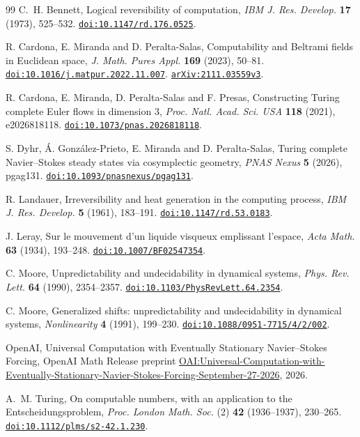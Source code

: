 \documentclass[11pt]{article}
\begin{document}


\begin{thebibliography}{99}
 C.~H. Bennett, Logical reversibility of computation,
\emph{IBM J. Res. Develop.} \textbf{17} (1973), 525--532.
\href{https://doi.org/10.1147/rd.176.0525}{\nolinkurl{doi:10.1147/rd.176.0525}}.

 R. Cardona, E. Miranda and D. Peralta-Salas,
Computability and Beltrami fields in Euclidean space,
\emph{J. Math. Pures Appl.} \textbf{169} (2023), 50--81.
\href{https://doi.org/10.1016/j.matpur.2022.11.007}{\nolinkurl{doi:10.1016/j.matpur.2022.11.007}}.
\href{https://arxiv.org/abs/2111.03559v3}{\nolinkurl{arXiv:2111.03559v3}}.

 R. Cardona, E. Miranda, D. Peralta-Salas and F. Presas,
Constructing Turing complete Euler flows in dimension 3,
\emph{Proc. Natl. Acad. Sci. USA} \textbf{118} (2021), e2026818118.
\href{https://doi.org/10.1073/pnas.2026818118}{\nolinkurl{doi:10.1073/pnas.2026818118}}.

 S. Dyhr, \'{A}. Gonz\'alez-Prieto, E. Miranda and
D. Peralta-Salas, Turing complete Navier--Stokes steady states via
cosymplectic geometry, \emph{PNAS Nexus} \textbf{5} (2026), pgag131.
\href{https://doi.org/10.1093/pnasnexus/pgag131}{\nolinkurl{doi:10.1093/pnasnexus/pgag131}}.

 R. Landauer, Irreversibility and heat generation in
the computing process, \emph{IBM J. Res. Develop.} \textbf{5} (1961),
183--191.
\href{https://doi.org/10.1147/rd.53.0183}{\nolinkurl{doi:10.1147/rd.53.0183}}.

 J. Leray, Sur le mouvement d'un liquide visqueux
emplissant l'espace, \emph{Acta Math.} \textbf{63} (1934), 193--248.
\href{https://doi.org/10.1007/BF02547354}{\nolinkurl{doi:10.1007/BF02547354}}.

 C. Moore, Unpredictability and undecidability in
dynamical systems, \emph{Phys. Rev. Lett.} \textbf{64} (1990), 2354--2357.
\href{https://doi.org/10.1103/PhysRevLett.64.2354}{\nolinkurl{doi:10.1103/PhysRevLett.64.2354}}.

 C. Moore, Generalized shifts: unpredictability and
undecidability in dynamical systems, \emph{Nonlinearity} \textbf{4}
(1991), 199--230.
\href{https://doi.org/10.1088/0951-7715/4/2/002}{\nolinkurl{doi:10.1088/0951-7715/4/2/002}}.

OpenAI, Universal Computation with Eventually Stationary Navier--Stokes Forcing,
OpenAI Math Release preprint
\href{https://github.com/openai/math/blob/main/preprints/Universal-Computation-with-Eventually-Stationary-Navier-Stokes-Forcing-September-27-2026/manuscript.pdf}{OAI:Universal-Computation-with-Eventually-Stationary-Navier-Stokes-Forcing-September-27-2026},
2026.

 A.~M. Turing, On computable numbers, with an application
to the Entscheidungsproblem, \emph{Proc. London Math. Soc.} (2)
\textbf{42} (1936--1937), 230--265.
\href{https://doi.org/10.1112/plms/s2-42.1.230}{\nolinkurl{doi:10.1112/plms/s2-42.1.230}}.
\end{thebibliography}
\end{document}

